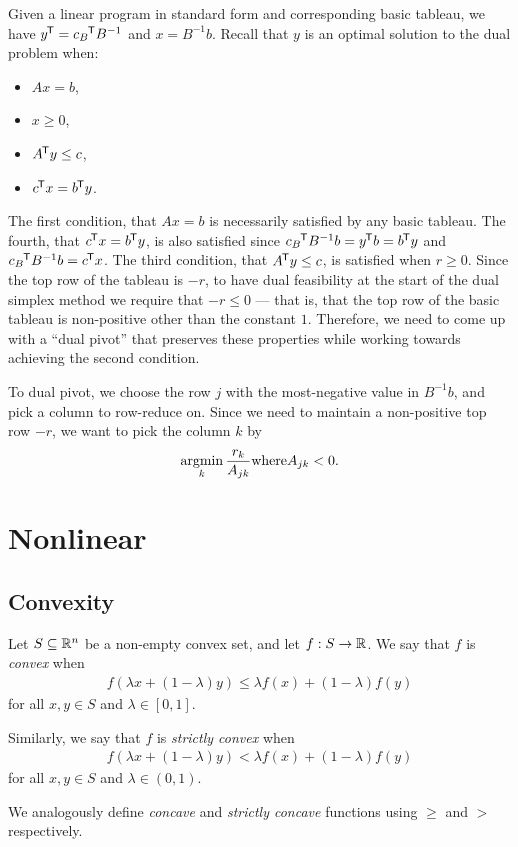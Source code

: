 Given a linear program in standard form and corresponding basic tableau, we have ${y}^{\mkern-1.5mu\mathsf{T}} = {c_B}^{\mkern-1.5mu\mathsf{T}}B^{-1}$ and $x = B^{-1}b$. Recall that $y$ is an optimal solution to the dual problem when:
\begin{itemize}
    \item $Ax = b$,
    \item $x \geq 0$,
    \item ${A}^{\mkern-1.5mu\mathsf{T}}y \leq c$,
    \item ${c}^{\mkern-1.5mu\mathsf{T}}x = {b}^{\mkern-1.5mu\mathsf{T}}y$.
\end{itemize}

The first condition, that $Ax = b$ is necessarily satisfied by any basic tableau. The fourth, that ${c}^{\mkern-1.5mu\mathsf{T}}x = {b}^{\mkern-1.5mu\mathsf{T}}y$, is also satisfied since ${c_B}^{\mkern-1.5mu\mathsf{T}}B^{-1}b = {y}^{\mkern-1.5mu\mathsf{T}}b = {b}^{\mkern-1.5mu\mathsf{T}}y$ and ${c_B}^{\mkern-1.5mu\mathsf{T}}B^{-1}b = {c}^{\mkern-1.5mu\mathsf{T}}x$. The third condition, that ${A}^{\mkern-1.5mu\mathsf{T}}y \leq c$, is satisfied when $r \geq 0$. Since the top row of the tableau is $-r$, to have dual feasibility at the start of the dual simplex method we require that $-r \leq 0$ --- that is, that the top row of the basic tableau is non-positive other than the constant $1$. Therefore, we need to come up with a ``dual pivot'' that preserves these properties while working towards achieving the second condition.

To dual pivot, we choose the row $j$ with the most-negative value in $B^{-1}b$, and pick a column to row-reduce on. Since we need to maintain a non-positive top row $-r$, we want to pick the column $k$ by \[\operatorname*{argmin}_{k}\frac{r_k}{A_{jk}} \mathrm{ where } A_{jk} < 0.\]

\section{Nonlinear}

\subsection{Convexity}

\begin{defn}
    Let $S \subseteq \mathbb{R}^n$ be a non-empty convex set, and let $f: S \to \mathbb{R}$. We say that $f$ is \emph{convex} when
    \begin{align*}
        f\left(\lambda x + (1 - \lambda)y\right) \leq \lambda f(x) + (1 - \lambda)f(y)
    \end{align*}
    for all $x, y \in S$ and $\lambda \in [0, 1]$.

    Similarly, we say that $f$ is \emph{strictly convex} when
    \begin{align*}
        f\left(\lambda x + (1 - \lambda)y\right) < \lambda f(x) + (1 - \lambda)f(y)
    \end{align*}
    for all $x, y \in S$ and $\lambda \in (0, 1)$.

    We analogously define \emph{concave} and \emph{strictly concave} functions using $\geq$ and $>$ respectively.
\end{defn}

